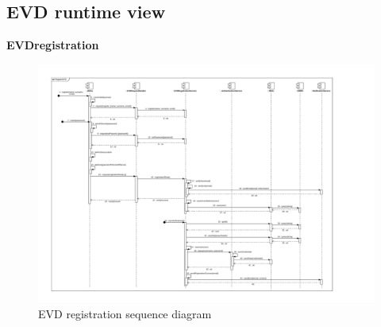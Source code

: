 \subsection{EVD runtime view}
\textbf{EVDregistration}\\
\begin{figure}[H]
    \centering
    \includegraphics[trim={1cm 1cm 5.9cm 1cm},clip, width=1\textwidth]{Images/cp2/runtime/EVDRegistration.pdf}
    \caption{EVD registration sequence diagram}
\end{figure}

